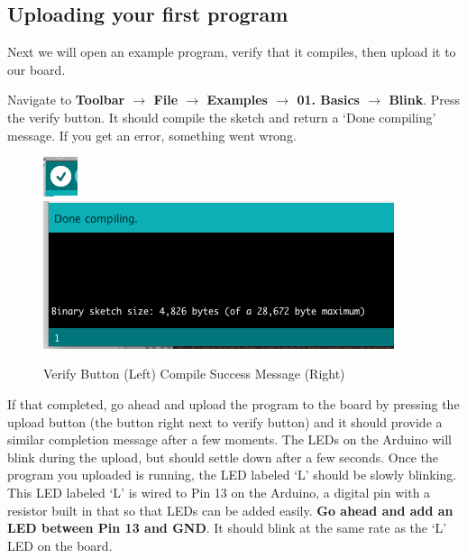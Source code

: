\documentclass[11pt,a4paper]{article}
\begin{document}


\subsection{Uploading your first program} %
\label{sub:uploading_your_first_program}
Next we will open an example program, verify that it compiles, then upload it to our board.


Navigate to \textbf{Toolbar $\rightarrow$ File $\rightarrow$ Examples $\rightarrow$ 01. Basics $\rightarrow$ Blink}.  Press the verify button.  It should compile the sketch and return a `Done compiling' message.  If you get an error, something went wrong.

    \begin{figure}[htbp]
        \centering
            \includegraphics{figures/verify.png}\includegraphics{figures/compile.png}
        \caption{Verify Button (Left) Compile Success Message (Right)}
        \label{fig:figures_verify}
    \end{figure}

    If that completed, go ahead and upload the program to the board by pressing the upload button (the button right next to verify button) and it should provide a similar completion message after a few moments.  The LEDs on the Arduino will blink during the upload, but should settle down after a few seconds.  Once the program you uploaded is running, the LED labeled `L' should be slowly blinking.  This LED labeled `L' is wired to Pin 13 on the Arduino, a digital pin with a resistor built in that so that LEDs can be added easily.  \textbf{Go ahead and add an LED between Pin 13 and GND}.  It should blink at the same rate as the `L' LED on the board.

\end{document}
